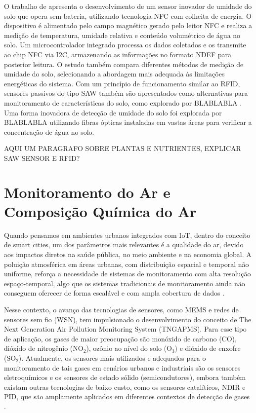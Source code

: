 \documentclass[conference]{IEEEtran}
\begin{document}
O trabalho de \textcite{boada_2018_batteryless} apresenta o desenvolvimento de um sensor inovador de umidade do solo que opera sem bateria, utilizando tecnologia NFC com colheita de energia. O dispositivo é alimentado pelo campo magnético gerado pelo leitor NFC e realiza a medição de temperatura, umidade relativa e conteúdo volumétrico de água no solo. Um microcontrolador integrado processa os dados coletados e os transmite ao chip NFC via I2C, armazenando as informações no formato NDEF para posterior leitura. O estudo também compara diferentes métodos de medição de umidade do solo, selecionando a abordagem mais adequada às limitações energéticas do sistema. Com um princípio de funcionamento similar ao RFID, sensores passivos do tipo SAW também são apresentados como alternativas para monitoramento de características do solo, como explorado por BLABLABLA \textcite{akhileshnagpure_2022_water}. Uma forma inovadora de detecção de umidade do solo foi explorada por BLABLABLA \textcite{akhileshnagpure_2022_water} utilizando fibras ópticas instaladas em vastas áreas para verificar a concentração de água no solo.

AQUI UM PARAGRAFO SOBRE PLANTAS E NUTRIENTES, EXPLICAR SAW SENSOR E RFID?

\section{Monitoramento do Ar e Composição Química do Ar}
Quando pensamos em ambientes urbanos integrados com IoT, dentro do conceito de smart cities, um dos parâmetros mais relevantes é a qualidade do ar, devido aos impactos diretos na saúde pública, no meio ambiente e na economia global. A poluição atmosférica em áreas urbanas, com distribuição espacial e temporal não uniforme, reforça a necessidade de sistemas de monitoramento com alta resolução espaço-temporal, algo que os sistemas tradicionais de monitoramento ainda não conseguem oferecer de forma escalável e com ampla cobertura de dados \cite{yi_2015_a}.

Nesse contexto, o avanço das tecnologias de sensores, como MEMS e redes de sensores sem fio (WSN), tem impulsionado o desenvolvimento do conceito de The Next Generation Air Pollution Monitoring System (TNGAPMS). Para esse tipo de aplicação, os gases de maior preocupação são monóxido de carbono (CO), dióxido de nitrogênio (NO$_2$), ozônio ao nível do solo (O$_3$) e dióxido de enxofre (SO$_2$). Atualmente, os sensores mais utilizados e adequados para o monitoramento de tais gases em cenários urbanos e industriais são os sensores eletroquímicos e os sensores de estado sólido (semicondutores), embora também existam outras tecnologias de baixo custo, como os sensores catalíticos, NDIR e PID, que são amplamente aplicados em diferentes contextos de detecção de gases \cite{yi_2015_a}.
\end{document}
